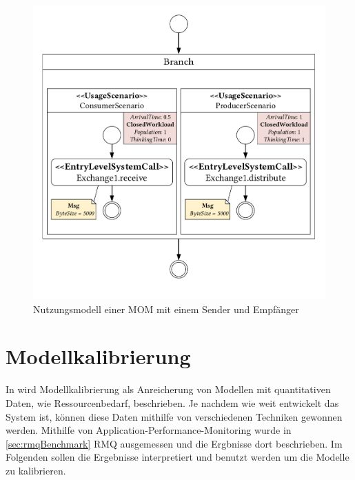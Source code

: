 \begin{figure}
\center
  \includegraphics[width=1\textwidth]{images/modelling/modelingUsage.pdf}
  \caption{Nutzungsmodell einer MOM mit einem Sender und Empfänger}
  \label{img:mom_usage}
\end{figure}

\section{Modellkalibrierung}
\label{sec:rmqRd}
In \cite{palladio17} wird Modellkalibrierung als Anreicherung von Modellen mit quantitativen Daten, wie Ressourcenbedarf, beschrieben. Je nachdem wie weit entwickelt das System ist, können diese Daten mithilfe von verschiedenen Techniken gewonnen werden. Mithilfe von Application-Performance-Monitoring wurde in \autoref{sec:rmqBenchmark} RMQ ausgemessen und die Ergbnisse dort beschrieben. Im Folgenden sollen die Ergebnisse interpretiert und benutzt werden um die Modelle zu kalibrieren.

